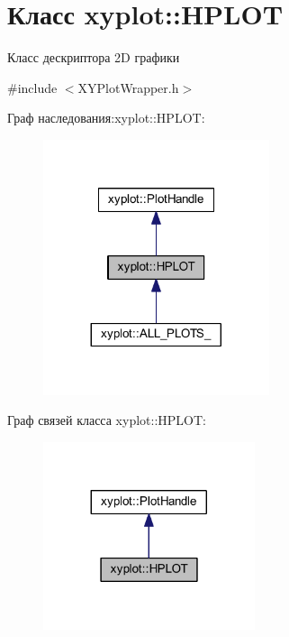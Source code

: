 \hypertarget{classxyplot_1_1_h_p_l_o_t}{\section{Класс xyplot\-:\-:H\-P\-L\-O\-T}
\label{classxyplot_1_1_h_p_l_o_t}
}


Класс дескриптора 2\-D графики  




{\ttfamily \#include $<$X\-Y\-Plot\-Wrapper.\-h$>$}



Граф наследования\-:xyplot\-:\-:H\-P\-L\-O\-T\-:\nopagebreak
\begin{figure}[H]
\begin{center}
\leavevmode
\includegraphics[width=188pt]{classxyplot_1_1_h_p_l_o_t__inherit__graph}
\end{center}
\end{figure}


Граф связей класса xyplot\-:\-:H\-P\-L\-O\-T\-:\nopagebreak
\begin{figure}[H]
\begin{center}
\leavevmode
\includegraphics[width=176pt]{classxyplot_1_1_h_p_l_o_t__coll__graph}
\end{center}
\end{figure}
